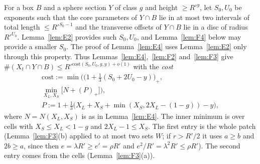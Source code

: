 \documentclass[aps,prx,twocolumn,superscriptaddress,nofootinbib,longbibliography]{revtex4-2}
\theoremstyle{plain}
\theoremstyle{definition}
\theoremstyle{remark}
\begin{document}
For a box $B$ and a sphere section $Y$ of class $g$ and height $\ge R'^y$, let $S_0,U_0$ be exponents such that the core parameters of $Y\cap B$ lie in at most two intervals of total length $\le R'^{S_0-1}$ and the transverse offsets of $Y\cap B$ lie in a disc of radius $R'^{U_0}$. Lemma~\ref{lem:E2} provides such $S_0,U_0$, and Lemma~\ref{lem:F4} below may provide a smaller $S_0$. The proof of Lemma~\ref{lem:E4} uses Lemma~\ref{lem:E2} only through this property. Thus Lemmas~\ref{lem:E4},~\ref{lem:F2} and~\ref{lem:F3} give $\#(X_t\cap Y\cap B)\le R'^{\mathrm{cost}(S_0,U_0,g,y)+o(1)}$ with the \emph{cost}
\begin{equation}\label{eq:cost}
\begin{gathered}
\mathrm{cost}:=\min\Big(\big(1+\tfrac13(S_0+2U_0-y)\big)_+,\\ \min_{X_L,X_S}\big[N+(P)_+\big]\Big),\\
P:=1+\tfrac13\big(X_L+X_S+\min(X_S,2X_L-(1-g))-y\big),
\end{gathered}
\end{equation}
where $N=N(X_L,X_S)$ is as in Lemma~\ref{lem:E4}. The inner minimum is over cells with $X_S\le X_L<1-g$ and $2X_L-1\le X_S$. The first entry is the whole patch (Lemma~\ref{lem:F3}(b) applied to at most two sets $W$; if $r>R'/2$ it uses $a\ge b$ and $2b\ge a$, since then $e=\lambda R'\ge e'=\rho R'$ and $e^2/R'=\lambda^2R'\le\rho R'$). The second entry comes from the cells (Lemma~\ref{lem:F3}(a)).
\end{document}
